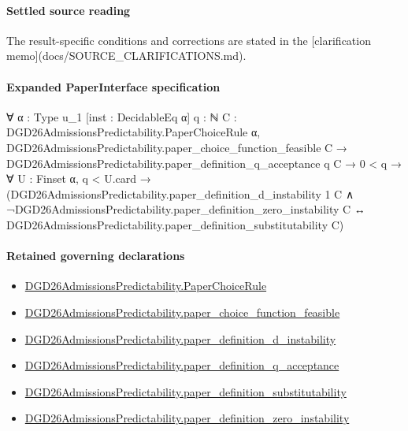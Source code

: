 \documentclass[10pt]{article}
\begin{document}
\paragraph{Settled source reading}
The result-\allowbreak{}specific conditions and corrections are stated in the [clarification memo](docs/\allowbreak{}SOURCE\_\allowbreak{}CLARIFICATIONS.\allowbreak{}md).\allowbreak{}

\paragraph{Expanded PaperInterface specification}
\begin{ReviewVerbatim}
∀ {α : Type u_1} [inst : DecidableEq α] {q : ℕ} {C : DGD26AdmissionsPredictability.PaperChoiceRule α},
  DGD26AdmissionsPredictability.paper_choice_function_feasible C →
    DGD26AdmissionsPredictability.paper_definition_q_acceptance q C →
      0 < q →
        ∀ {U : Finset α},
          q < U.card →
            (DGD26AdmissionsPredictability.paper_definition_d_instability 1 C ∧
                ¬DGD26AdmissionsPredictability.paper_definition_zero_instability C ↔
              DGD26AdmissionsPredictability.paper_definition_substitutability C)
\end{ReviewVerbatim}

\paragraph{Retained governing declarations}
\begin{itemize}\raggedright
\item \hyperlink{governing-declaration-4678951b4432b184}{DGD26\allowbreak{}Admissions\allowbreak{}Predictability.\allowbreak{}Paper\allowbreak{}Choice\allowbreak{}Rule}
\item \hyperlink{governing-declaration-f7de74a44053f6d5}{DGD26\allowbreak{}Admissions\allowbreak{}Predictability.\allowbreak{}paper\_\allowbreak{}choice\_\allowbreak{}function\_\allowbreak{}feasible}
\item \hyperlink{governing-declaration-ce2c1c7a5233a84a}{DGD26\allowbreak{}Admissions\allowbreak{}Predictability.\allowbreak{}paper\_\allowbreak{}definition\_\allowbreak{}d\_\allowbreak{}instability}
\item \hyperlink{governing-declaration-7ecd62274fb2f391}{DGD26\allowbreak{}Admissions\allowbreak{}Predictability.\allowbreak{}paper\_\allowbreak{}definition\_\allowbreak{}q\_\allowbreak{}acceptance}
\item \hyperlink{governing-declaration-39cdd64a379d386b}{DGD26\allowbreak{}Admissions\allowbreak{}Predictability.\allowbreak{}paper\_\allowbreak{}definition\_\allowbreak{}substitutability}
\item \hyperlink{governing-declaration-c23ecf0aa84721c4}{DGD26\allowbreak{}Admissions\allowbreak{}Predictability.\allowbreak{}paper\_\allowbreak{}definition\_\allowbreak{}zero\_\allowbreak{}instability}
\end{itemize}
\end{document}
